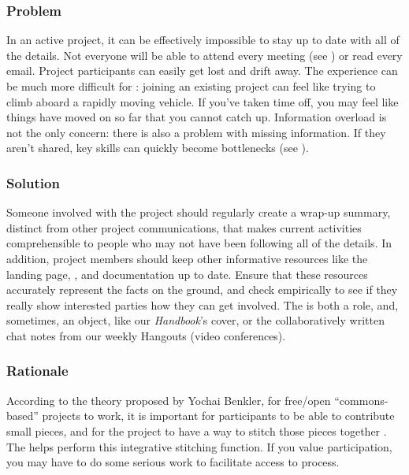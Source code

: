 \subsubsection*{Problem} In an active project, it can be effectively impossible to stay up to date with all of the details.  Not everyone will be able to attend every meeting (see ) or read every email.  Project participants can easily get lost and drift away.  The experience can be much more difficult for : joining an existing project can feel like trying to climb aboard a rapidly moving vehicle.  If you've taken time off, you may feel like things have moved on so far that you cannot catch up.  Information overload is not the only concern: there is also a problem with missing information.  If they aren't shared, key skills can quickly become bottlenecks (see ).

\subsubsection*{Solution}
Someone involved with the project should regularly create a wrap-up summary, distinct from other project communications, that makes current activities comprehensible to people who may not have been following all of the details.  In addition, project members should keep other informative resources like the landing page, , and documentation up to date. Ensure that these resources accurately represent the facts on the ground, and check empirically to see if they really show interested parties how they can get involved.
The  is both a role, and, sometimes, an object, like our \emph{Handbook}'s cover, or the collaboratively written chat notes from our weekly Hangouts (video conferences). 

\subsubsection*{Rationale}
According to the theory proposed by Yochai Benkler, for free/open ``commons-based'' projects to work, it is important for participants to be able to contribute small pieces, and for the project to have a way to stitch those pieces together \cite{coases-penguin}. The  helps perform this integrative stitching function. If you value participation, you may have to do some serious work to facilitate access to process.

